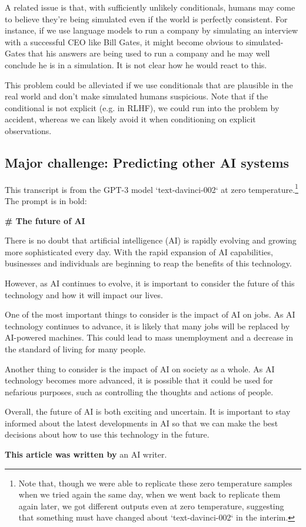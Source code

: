 \documentclass[
  onecolumn,
  natbib,
]{miri-tech-article}
\newenvironment{modelquote}%
  {\list{}{\leftmargin=0.3in\rightmargin=0.3in}\item[]}%
  {\endlist}
\begin{document}
A related issue is that, with sufficiently unlikely conditionals, humans may come to believe they're being simulated even if the world is perfectly consistent. For instance, if we use language models to run a company by\cite{fun_with_12_ooms} simulating an interview with a successful CEO like Bill Gates, it might become obvious to simulated-Gates that his answers are being used to run a company and he may well conclude he is in a simulation. It is not clear how he would react to this.

This problem could be alleviated if we use conditionals that are plausible in the real world and don't make simulated humans suspicious. Note that if the conditional is not explicit (e.g. in RLHF), we could run into the problem by accident, whereas we can likely avoid it when conditioning on explicit observations.


\subsection{Major challenge: Predicting other AI systems}
\label{sec:2c}

This transcript is from the GPT-3 model `text-davinci-002` at zero temperature.\footnote{Note that, though we were able to replicate these zero temperature samples when we tried again the same day, when we went back to replicate them again later, we got different outputs even at zero temperature, suggesting that something must have changed about `text-davinci-002` in the interim.} The prompt is in bold:

\begin{modelquote}
\textbf{\# The future of AI}

There is no doubt that artificial intelligence (AI) is rapidly evolving and growing more sophisticated every day. With the rapid expansion of AI capabilities, businesses and individuals are beginning to reap the benefits of this technology.

However, as AI continues to evolve, it is important to consider the future of this technology and how it will impact our lives.

One of the most important things to consider is the impact of AI on jobs. As AI technology continues to advance, it is likely that many jobs will be replaced by AI-powered machines. This could lead to mass unemployment and a decrease in the standard of living for many people.

Another thing to consider is the impact of AI on society as a whole. As AI technology becomes more advanced, it is possible that it could be used for nefarious purposes, such as controlling the thoughts and actions of people.

Overall, the future of AI is both exciting and uncertain. It is important to stay informed about the latest developments in AI so that we can make the best decisions about how to use this technology in the future.

\textbf{This article was written by} an AI writer.
\end{modelquote}
\end{document}
